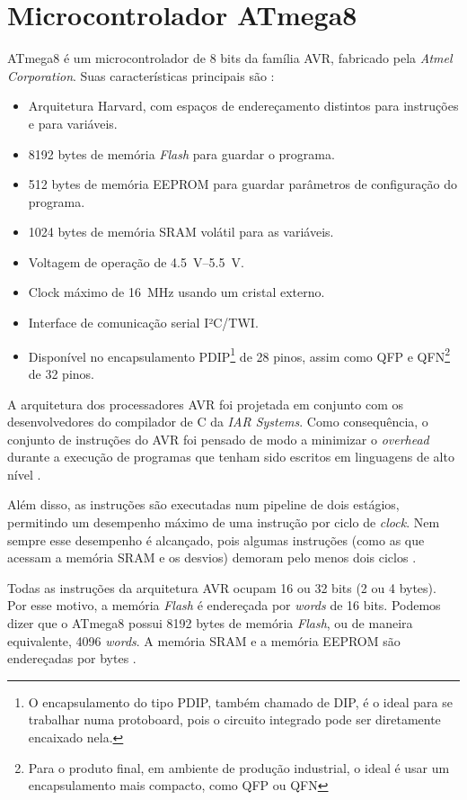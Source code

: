 \documentclass[brazil,pagestart=firstchapter]{abnt}
\begin{document}
\section{Microcontrolador ATmega8}
\label{sec:atmega8}

ATmega8 é um microcontrolador de 8 bits da família AVR, fabricado pela
\textit{Atmel Corporation}. Suas características principais são
\cite{ATmega8}:

\begin{itemize}
\item Arquitetura Harvard, com espaços de endereçamento distintos para
instruções e para variáveis.
\item \num{8192} bytes de memória \textit{Flash} para guardar o programa.
\item \num{512} bytes de memória \ac{EEPROM} para guardar parâmetros de
configuração do programa.
\item \num{1024} bytes de memória \ac{SRAM} volátil para as variáveis.
\item Voltagem de operação de \SIrange{4.5}{5.5}{\volt}.
\item Clock máximo de \SI{16}{\mega\hertz} usando um cristal externo.
\item Interface de comunicação serial I²C/TWI.
\item Disponível no encapsulamento PDIP\footnote{
	O encapsulamento do tipo \ac{PDIP}, também chamado de \ac{DIP}, é o
	ideal para se trabalhar numa protoboard, pois o circuito integrado pode
	ser diretamente encaixado nela.}
de 28 pinos, assim como QFP e QFN\footnote{
	Para o produto final, em ambiente de produção industrial, o ideal é usar
	um encapsulamento mais compacto, como \ac{QFP} ou \ac{QFN}}
de 32 pinos.
\end{itemize}

A arquitetura dos processadores AVR foi projetada em conjunto com os
desenvolvedores do compilador de C da \textit{IAR Systems}. Como
consequência, o conjunto de instruções do AVR foi pensado de modo a
minimizar o \textit{overhead} durante a execução de programas que tenham
sido escritos em linguagens de alto nível \cite{avr_iar_design}.

Além disso, as instruções são executadas num pipeline de dois estágios,
permitindo um desempenho máximo de uma instrução por ciclo de
\textit{clock}. Nem sempre esse desempenho é
alcançado, pois algumas instruções (como as que acessam a memória \ac{SRAM}
e os desvios) demoram pelo menos dois ciclos \cite{ATmega8}.

Todas as instruções da arquitetura AVR ocupam 16 ou 32 bits (2 ou 4 bytes).
Por esse motivo, a memória \textit{Flash} é endereçada por \textit{words} de
16 bits. Podemos dizer que o ATmega8 possui \num{8192} bytes de memória
\textit{Flash}, ou de maneira equivalente, \num{4096} \textit{words}.
A memória \ac{SRAM} e a memória \ac{EEPROM} são
endereçadas por bytes \cite{ATmega8}.
\end{document}
